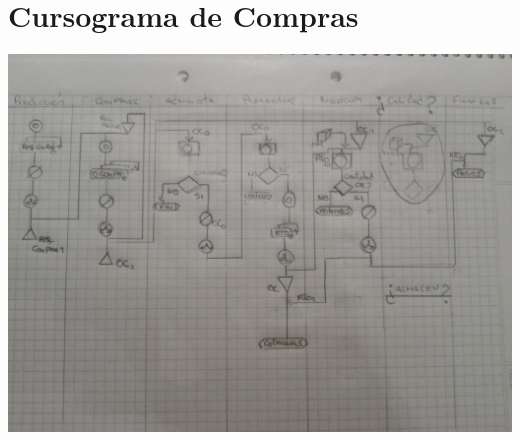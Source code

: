\section{Cursograma de Compras}
\includegraphics [angle=90,width=\linewidth]{Empresa/Circuitos/Compras/Compras.jpg}
\pagebreak

